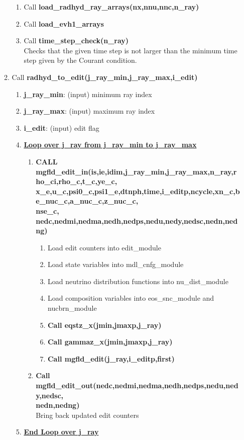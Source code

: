 \documentclass[11pt,doublespace]{article}
\begin{document}
\begin{itemize}
\begin{enumerate}
\begin{enumerate}
  \item Call {\bf load\_radhyd\_ray\_arrays(nx,nnu,nnc,n\_ray)}
  \item Call {\bf load\_evh1\_arrays}
  \item Call {\bf time\_step\_check(n\_ray)}\\
  Checks that the given time step is not larger than the minimum time step given by the Courant condition.
\end{enumerate}
  \item Call {\bf radhyd\_to\_edit(j\_ray\_min,j\_ray\_max,i\_edit)}
\begin{enumerate}
  \item {\bf j\_ray\_min}: (input) minimum ray index
  \item {\bf j\_ray\_max}: (input) maximum ray index
  \item {\bf i\_edit}: (input) edit flag
  \item {\bf {\underline{Loop over j\_ray from j\_ray\_min to j\_ray\_max}}}
\begin{enumerate}
  \item {\bf CALL mgfld\_edit\_in(is,ie,idim,j\_ray\_min,j\_ray\_max,n\_ray,rho\_ci,rho\_c,t\_c,ye\_c,\\
x\_e,u\_c,psi0\_c,psi1\_e,dtnph,time,i\_editp,ncycle,xn\_c,be\_nuc\_c,a\_nuc\_c,z\_nuc\_c,\\
nse\_c, nedc,nedmi,nedma,nedh,nedps,nedu,nedy,nedsc,nedn,nedng)}
\begin{enumerate}
  \item Load edit counters into edit\_module
  \item Load state variables into mdl\_cnfg\_module
  \item Load neutrino distribution functions into nu\_dist\_module
  \item Load composition variables into eos\_snc\_module and nucbrn\_module
  \item {\bf Call eqstz_x(jmin,jmaxp,j\_ray)}
  \item {\bf Call gammaz_x(jmin,jmaxp,j\_ray)}
  \item {\bf Call mgfld\_edit(j\_ray,i\_editp,first)}
\end{enumerate}
  \item {\bf Call mgfld\_edit\_out(nedc,nedmi,nedma,nedh,nedps,nedu,nedy,nedsc,\\
  nedn,nedng)}\\
  Bring back updated edit counters
\end{enumerate}
  \item {\bf {\underline{End Loop over j\_ray}}}
\end{enumerate}
\end{enumerate}
\end{itemize}
\end{document}
